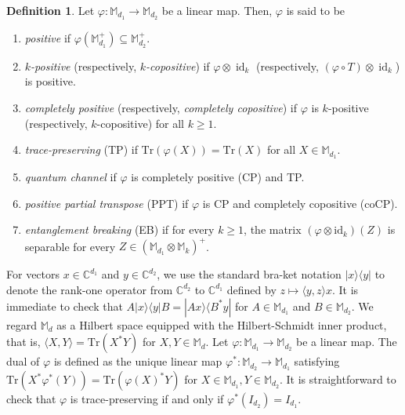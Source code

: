 \documentclass[11pt,reqno]{amsart}
\theoremstyle{definition}
\newtheorem{defn}{Definition}[section]
\theoremstyle{plain}
\theoremstyle{remark}
\numberwithin{equation}{section}%
\begin{document}
\begin{defn}
	Let $\varphi:\mathbb{M}_{d_1}\rightarrow\mathbb{M}_{d_2}$ be a linear map. Then, $\varphi$ is said to be
	\begin{enumerate}
		\item \textit{positive} if $\varphi(\mathbb{M}_{d_1}^+)\subseteq\mathbb{M}_{d_2}^+$.
		\item \textit{$k$-positive} (respectively, \textit{$k$-copositive}) if $\varphi\otimes\operatorname{id}_k$ (respectively, $(\varphi\circ T)\otimes\operatorname{id}_k$) is positive.
		\item \textit{completely positive} (respectively, \textit{completely copositive}) if $\varphi$ is $k$-positive (respectively, $k$-copositive) for all $k\geq 1$.
		\item \textit{trace-preserving} (TP) if $\text{Tr}(\varphi(X))=\text{Tr}(X)$ for all $X\in\mathbb{M}_{d_1}$.
		\item \textit{quantum channel} if $\varphi$ is completely positive (CP) and TP.
		\item \textit{positive partial transpose} (PPT) if $\varphi$ is CP and completely copositive (coCP).
		\item \textit{entanglement breaking} (EB) if for every $k\geq 1$, the matrix $(\varphi\otimes\text{id}_k)(Z)$ is separable for every $Z\in(\mathbb{M}_{d_1}\otimes \mathbb{M}_k)^+$.
	\end{enumerate}
\end{defn}

 For vectors $x \in \mathbb{C}^{d_1}$ and $y \in \mathbb{C}^{d_2}$, we use the standard bra-ket notation $|x\rangle\langle y|$ to denote the rank-one operator from $\mathbb{C}^{d_2}$ to $\mathbb{C}^{d_1}$ defined by $z \mapsto \langle y, z\rangle x$. It is immediate to check that $A|x \rangle\langle y|B=|Ax \rangle\langle B^*y|$ for $A\in\mathbb{M}_{d_1}$ and $B\in\mathbb{M}_{d_2}$. We regard $\mathbb{M}_d$ as a Hilbert space equipped with the Hilbert-Schmidt inner product, that is, $\langle X, Y\rangle=\text{Tr}(X^*Y)$ for $X,Y\in\mathbb{M}_d$. Let $\varphi:\mathbb{M}_{d_1}\rightarrow\mathbb{M}_{d_2}$ be a linear map. The dual of $\varphi$ is defined as the unique linear map $\varphi^*:\mathbb{M}_{d_2}\rightarrow\mathbb{M}_{d_1}$ satisfying $\text{Tr}(X^*\varphi^*(Y))=\text{Tr}(\varphi(X)^*Y)$ for $X\in\mathbb{M}_{d_1}, Y\in\mathbb{M}_{d_2}$. It is straightforward to check that $\varphi$ is trace-preserving if and only if $\varphi^*(I_{d_2})=I_{d_1}$. 
 
 
 
\end{document}
